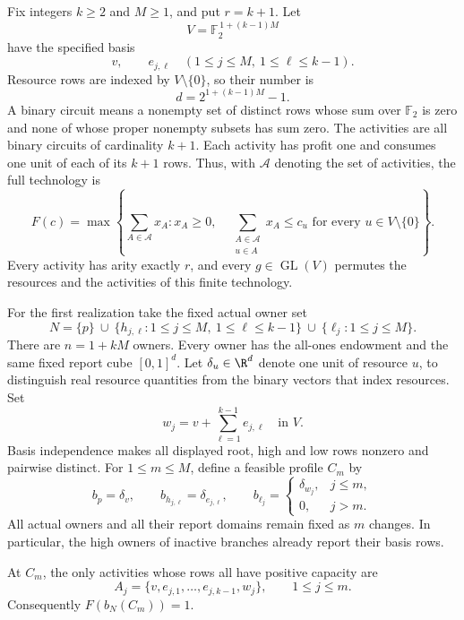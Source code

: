 Fix integers $k\geq2$ and $M\geq1$, and put $r=k+1$.  Let
\[
  V=\mathbb F_2^{\,1+(k-1)M}
\]
have the specified basis
\[
  v,\qquad e_{j,\ell}\quad
  (1\leq j\leq M,\ 1\leq\ell\leq k-1).
\]
Resource rows are indexed by $V\setminus\{0\}$, so their number is
\begin{equation}
  d=2^{1+(k-1)M}-1.
  \label{arity:row-count}
\end{equation}
A binary circuit means a nonempty set of distinct rows whose sum over
$\mathbb F_2$ is zero and none of whose proper nonempty subsets has sum zero.
The activities are all binary circuits of cardinality $k+1$.  Each activity
has profit one and consumes one unit of each of its $k+1$ rows.  Thus, with
$\mathcal A$ denoting the set of activities, the full technology is
\begin{equation}
  F(c)=\max\left\{
    \sum_{A\in\mathcal A}x_A:
    x_A\geq0,\quad
    \sum_{\substack{A\in\mathcal A\\u\in A}}x_A\leq c_u
       \text{ for every }u\in V\setminus\{0\}
  \right\}.
  \label{arity:technology}
\end{equation}
Every activity has arity exactly $r$, and every $g\in\operatorname{GL}(V)$
permutes the resources and the activities of this finite technology.

For the first realization take the fixed actual owner set
\[
  N=\{p\}\ \cup\
  \{h_{j,\ell}:1\leq j\leq M,\ 1\leq\ell\leq k-1\}
  \ \cup\ \{\ell_j:1\leq j\leq M\}.
\]
There are $n=1+kM$ owners.  Every owner has the all-ones endowment and the
same fixed report cube $[0,1]^d$.  Let $\delta_u\in\R^d$ denote one unit of
resource $u$, to distinguish real resource quantities from the binary
vectors that index resources.  Set
\[
  w_j=v+\sum_{\ell=1}^{k-1}e_{j,\ell}\quad\text{in }V.
\]
Basis independence makes all displayed root, high and low rows nonzero and
pairwise distinct.
For $1\leq m\leq M$, define a feasible profile $C_m$ by
\begin{equation}
  b_p=\delta_v,\qquad
  b_{h_{j,\ell}}=\delta_{e_{j,\ell}},\qquad
  b_{\ell_j}=
  \begin{cases}
    \delta_{w_j},&j\leq m,\\
    0,&j>m.
  \end{cases}
  \label{arity:profiles}
\end{equation}
All actual owners and all their report domains remain fixed as $m$ changes.
In particular, the high owners of inactive branches already report their
basis rows.

\begin{lemma}
\label{arity:supported}
At $C_m$, the only activities whose rows all have positive capacity are
\[
  A_j=\{v,e_{j,1},\ldots,e_{j,k-1},w_j\},
  \qquad 1\leq j\leq m.
\]
Consequently $F(b_N(C_m))=1$.
\end{lemma}

